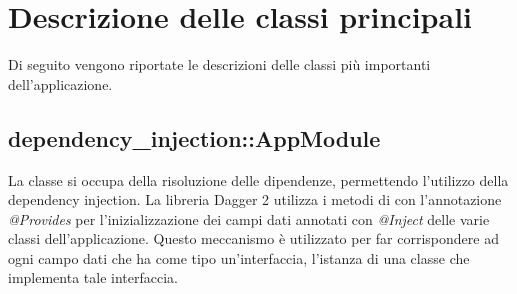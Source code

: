 \documentclass[../Tesi.tex]{subfiles}
\begin{document}
	\section{Descrizione delle classi principali}
	Di seguito vengono riportate le descrizioni delle classi più importanti dell'applicazione.

		\subsection{dependency\_injection::AppModule}
		La classe  si occupa della risoluzione delle dipendenze, permettendo l'utilizzo della dependency injection. La libreria Dagger 2 utilizza i metodi di  con l'annotazione \textit{@Provides} per l'inizializzazione dei campi dati annotati con \textit{@Inject} delle varie classi dell'applicazione. Questo meccanismo è utilizzato per far corrispondere ad ogni campo dati che ha come tipo un'interfaccia, l'istanza di una classe che implementa tale interfaccia.
\end{document}
